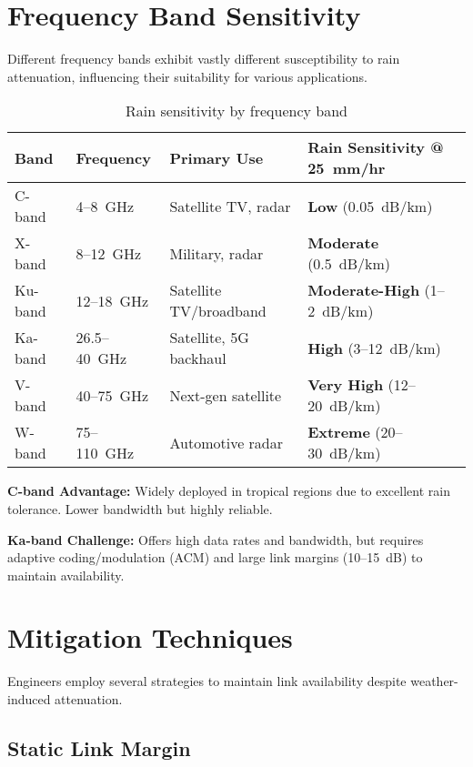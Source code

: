 \section{Frequency Band Sensitivity}

Different frequency bands exhibit vastly different susceptibility to rain attenuation, influencing their suitability for various applications.

\begin{table}[h!]
\centering
\caption{Rain sensitivity by frequency band}
\label{tab:band-sensitivity}
\begin{tabular}{@{}llll@{}}
\toprule
Band & Frequency & Primary Use & Rain Sensitivity @ 25~mm/hr \\
\midrule
C-band & 4--8~GHz & Satellite TV, radar & \textbf{Low} (0.05~dB/km) \\
X-band & 8--12~GHz & Military, radar & \textbf{Moderate} (0.5~dB/km) \\
Ku-band & 12--18~GHz & Satellite TV/broadband & \textbf{Moderate-High} (1--2~dB/km) \\
Ka-band & 26.5--40~GHz & Satellite, 5G backhaul & \textbf{High} (3--12~dB/km) \\
V-band & 40--75~GHz & Next-gen satellite & \textbf{Very High} (12--20~dB/km) \\
W-band & 75--110~GHz & Automotive radar & \textbf{Extreme} (20--30~dB/km) \\
\bottomrule
\end{tabular}
\end{table}

\textbf{C-band Advantage:} Widely deployed in tropical regions due to excellent rain tolerance. Lower bandwidth but highly reliable.

\textbf{Ka-band Challenge:} Offers high data rates and bandwidth, but requires adaptive coding/modulation (ACM) and large link margins (10--15~dB) to maintain availability.

\section{Mitigation Techniques}

Engineers employ several strategies to maintain link availability despite weather-induced attenuation.

\subsection{Static Link Margin}

